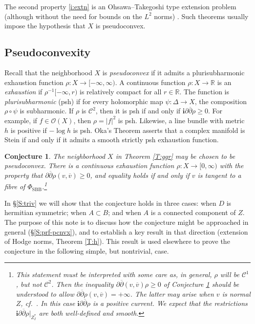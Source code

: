 \documentclass[12pt]{amsart}
\numberwithin{equation}{section}
\numberwithin{table}{section}
\def\cC{\mathcal{C}}
\def\bi{\mathbf{i}}
\def\cO{\mathcal{O}}
\def\bR{\mathbb{R}}
\newtheorem{conjecture}[equation]{Conjecture}
\theoremstyle{definition}
\theoremstyle{definition}
\theoremstyle{remark}
\def\ddb{\partial\overline{\partial}}
\def\PhiS{\Phi_\mathrm{SBB}}
\begin{document}
The second property \ref{i:extn} is an Ohsawa--Takegoshi type extension problem (although without the need for bounds on the $L^2$ norms) \cite{MR1782659, MR3525916}.  Such theorems usually impose the hypothesis that $X$ is pseudoconvex.

\subsection{Pseudoconvexity}

Recall that the neighborhood $X$ is \emph{pseudoconvex} if it admits a plurisubharmonic exhaustion function $\rho : X \to [-\infty,\infty)$.  A continuous function $\rho: X \to \bR$ is an \emph{exhaustion} if $\rho^{-1}[-\infty,r)$ is relatively compact for all $r \in \bR$.  The function is \emph{plurisubharmonic} (psh) if for every holomorphic map $\psi : \Delta \to X$, the composition $\rho \circ \psi$ is subharmonic.  If $\rho$ is $\cC^2$, then it is psh if and only if $\bi\ddb \rho \ge 0$.  For example, if $f \in \cO(X)$, then $\rho = |f|^2$ is psh.  Likewise, a line bundle with metric $h$ is positive if $-\log  h$ is psh.  Oka's Theorem asserts that a complex manifold is Stein if and only if it admits a smooth strictly psh exhaustion function.  

\begin{conjecture} \label{conj:pseudocnvx}
The neighborhood $X$ in Theorem \ref{T:ggr} may be chosen to be pseudoconvex.  There is a continuous exhaustion function $\rho : X \to [0,\infty)$ with the property that $\ddb \rho( v , \overline v) \ge 0$, and equality holds if and only if $v$ is tangent to a fibre of $\PhiS$.\footnote{This statement must be interpreted with some care as, in general, $\rho$ will be $\cC^1$, but not $\cC^2$.  Then the inequality $\ddb(v,\overline v) \rho \ge0$ of Conjecture \ref{conj:pseudocnvx} should be understood to allow $\ddb\rho(v,\overline v) =+\infty$.  The latter may arise when $v$ is normal $Z$, cf.~\cite{Robles-pseudocnvx-eg}.  In this case $\bi\ddb\rho$ is a positive current.  We expect that the restrictions $\bi\ddb\rho\big|_{Z_I^*}$  are both well-defined and smooth.}
\end{conjecture}

\noindent In \S\ref{S:triv} we will show that the conjecture holds in three cases: when $D$ is hermitian symmetric; when $A \subset B$; and when $A$ is a connected component of $Z$.   The purpose of this note is to discuss how the conjecture might be approached in general (\S\ref{S:prf-pcnvx}), and to establish a key result in that direction (extension of Hodge norms, Theorem \ref{T:h}).  This result is used elsewhere to prove the conjecture in the following simple, but nontrivial, case.
\end{document}
